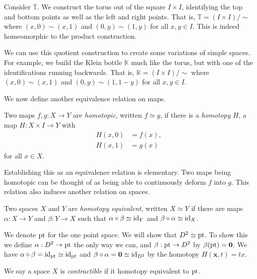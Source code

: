 \begin{example}
  Consider $\mathbb T$. We construct the torus out of the square $I \times I$, identifying the top and bottom points as well as the left and right points. That is, $\mathbb T = (I \times I)/{\sim}$ where $(x,0) \sim (x, 1)$ and $(0,y) \sim (1,y)$ for all $x,y \in I$. This is indeed homeomorphic to the product construction.
\end{example}

\begin{example}
  We can use this quotient construction to create some variations of simple spaces. For example, we build the Klein bottle $\mathbb K$ much like the torus, but with one of the identifications running backwards. That is, $\mathbb K = (I \times I)/{\sim}$ where $(x,0) \sim (x,1)$ and $(0,y) \sim (1, 1-y)$ for all $x,y \in I$.
\end{example}

We now define another equivalence relation on maps.

\begin{definition}[Homotopic]
  Two maps $f, g: X \to Y$ are \emph{homotopic}, written $f \simeq g$, if there is a \emph{homotopy} $H$, a map $H: X \times I \to Y$ with
  \begin{align*}
    H(x,0) & = f(x), \\
    H(x,1) & = g(x)
  \end{align*}
  for all $x \in X$.
\end{definition}

Establishing this as an equivalence relation is elementary. Two maps being homotopic can be thought of as being able to continuously deform $f$ into $g$. This relation also induces another relation on spaces.

\begin{definition}
  Two spaces $X$ and $Y$ are \emph{homotopy equivalent}, written $X \simeq Y$ if there are maps $\alpha: X \to Y$ and $\beta: Y \to X$ such that $\alpha\circ\beta \simeq \operatorname{id}_Y$ and $\beta\circ\alpha \simeq \operatorname{id}_X$. 
\end{definition}

\begin{example}
  We denote $\text{pt}$ for the one point space. We will show that $D^2 \simeq \text{pt}$. To show this we define $\alpha: D^2 \to \text{pt}$ the only way we can, and $\beta: \text{pt} \to D^2$ by $\beta(\text{pt}) = \bm 0$. We have $\alpha\circ\beta = \operatorname{id}_{\text{pt}} \simeq \operatorname{id}_{\text{pt}}$ and $\beta\circ\alpha = \bm 0 \simeq \operatorname{id}_{D^2}$ by the homotopy $H(\bm x, t) = tx$. 
\end{example}

\begin{definition}[Contractible]
  We say a space $X$ is \emph{contractible} if it homotopy equivalent to $\text{pt}$. 
\end{definition}
